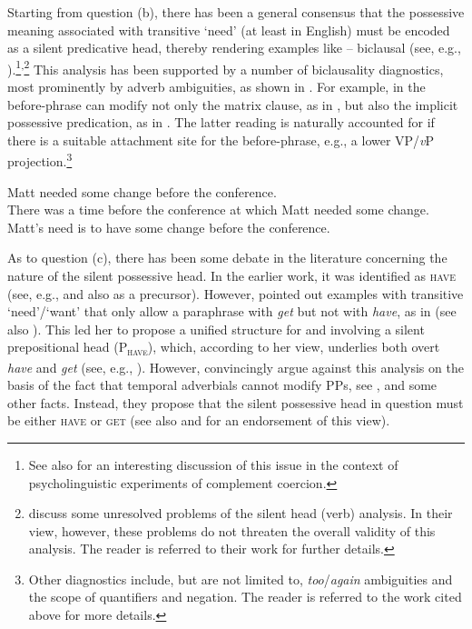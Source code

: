 \documentclass[output=paper,colorlinks,citecolor=brown]{langscibook}
\begin{document}
Starting from question (b), there has been a general consensus that the possessive meaning associated with transitive `need' (at least in English) must be encoded as a silent predicative head, thereby rendering examples like -- biclausal (see, e.g., \citealt{denDikken.Larson.Ludlow2018,Schwarz2006,Marusic.Zaucer2006,Harves2008,Zaroukian.Beller2013}).\footnote{See also \citet{Pylkkanen2008} for an interesting discussion of this issue in the context of psycho\-linguistic experiments of complement coercion.}\textsuperscript{,}\footnote{\citet{Marusic.Zaucer2006} discuss some unresolved problems of the silent head (verb) analysis. In their view, however, these problems do not threaten the overall validity of this analysis. The reader is referred to their work for further details.} This analysis has been supported by a number of biclausality diagnostics, most prominently by adverb ambiguities, as shown in . For example, in  the before-phrase can modify not only the matrix clause, as in , but also the implicit possessive predication, as in . The latter reading is naturally accounted for if there is a suitable attachment site for the before-phrase, e.g., a lower VP/\textit{v}P projection.\footnote{Other diagnostics include, but are not limited to, \textit{too}/\textit{again} ambiguities and the scope of quantifiers and negation. The reader is referred to the work cited above for more details.}

\ea\label{need-adverb} Matt needed some change before the conference.\\
\ea There was a time before the conference at which Matt needed some change.\label{need-adverb-high}\\
\ex Matt's need is to have some change before the conference.\label{need-adverb-low}\\
\hfill \citep[261]{Schwarz2006}
\z\z

\noindent As to question (c), there has been some debate in the literature concerning the nature of the silent possessive head. In the earlier work, it was identified as \textsc{have} (see, e.g., \citealt{denDikken.Larson.Ludlow2018} and also \citealt{Fodor.Lepore1998} as a precursor). However, \citet{Harley2004} pointed out examples with transitive `need'/`want' that only allow a paraphrase with \textit{get} but not with \textit{have}, as in  (see also \citealt{Harves2008}). This led her to propose a unified structure for  and  involving a silent prepositional head (P\textsubscript{\textsc{have}}), which, according to her view, underlies both overt \textit{have} and \textit{get} (see, e.g., \citealt{Harley2002}). However, \citet{Marusic.Zaucer2006} convincingly argue against this analysis on the basis of the fact that temporal adverbials cannot modify PPs, see , and some other facts. Instead, they propose that the silent possessive head in question must be either \textsc{have} or \textsc{get} (see also \citealt{Harves2008} and \citealt{Zaroukian.Beller2013} for an endorsement of this view).
\end{document}
